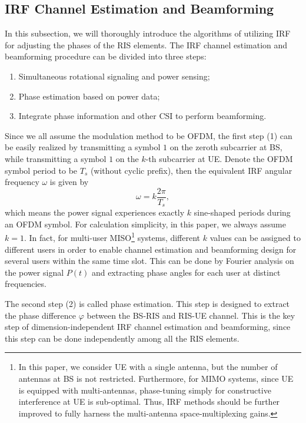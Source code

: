 \documentclass[12pt,draftclsnofoot,journal,onecolumn]{IEEEtran}
\theoremstyle{nonumberplain}
\begin{document}
\subsection{IRF Channel Estimation and Beamforming} \label{IRF Channel Estimation and Beamforming}
    In this subsection, we will thoroughly introduce the algorithms of utilizing \ac{IRF} for adjusting the phases of the RIS elements. The \ac{IRF} channel estimation and beamforming procedure can be divided into three steps:
    \begin{enumerate}
        \item Simultaneous rotational signaling and power sensing; 
        \item Phase estimation based on power data;
        \item Integrate phase information and other CSI to perform beamforming. 
    \end{enumerate} 
    Since we all assume the modulation method to be OFDM, the first step (1) can be easily realized by transmitting a symbol $1$ on the zeroth subcarrier at BS, while transmitting a symbol $1$ on the $k$-th subcarrier at UE. 
    Denote the OFDM symbol period to be $T_s$ (without cyclic prefix), then the equivalent IRF angular frequency $\omega$ is given by 
    \begin{equation}
        \omega = k \frac{2\pi}{T_s},
    \end{equation}
    which means the power signal experiences exactly $k$ sine-shaped periods during an OFDM symbol. For calculation simplicity, in this paper, we always assume $k=1$. In fact, for multi-user MISO\footnote{In this paper, we consider UE with a single antenna, but the number of antennas at BS is not restricted. Furthermore, for MIMO systems, since UE is equipped with multi-antennas, phase-tuning simply for constructive interference at UE is sub-optimal. Thus, IRF methods should be further improved to fully harness the multi-antenna space-multiplexing gains.} systems, different $k$ values can be assigned to different users in order to enable channel estimation and beamforming design for several users within the same time slot. 
    This can be done by Fourier analysis on the power signal $P(t)$ and extracting phase angles for each user at distinct frequencies. 

    The second step (2) is called phase estimation. This step is designed to extract the phase difference $\varphi$ between the BS-RIS and RIS-UE channel. 
    This is the key step of dimension-independent IRF channel estimation and beamforming, since this step can be done independently among all the RIS elements. 
\end{document}
